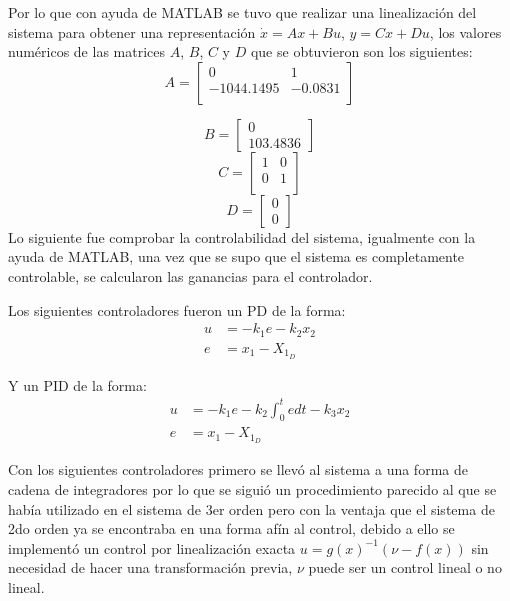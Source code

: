 \documentclass[onecolumn,10pt]{article}
\begin{document}
Por lo que con ayuda de MATLAB se tuvo que realizar una linealizaci\'on del sistema para obtener una representaci\'on $\dot{x}=Ax+Bu$, $y=Cx+Du$, los valores num\'ericos de las matrices $A$, $B$, $C$ y $D$ que se obtuvieron son los siguientes:
$$A=\begin{bmatrix}
0 & 1 \\
-1044.1495 & -0.0831\\
\end{bmatrix}$$

$$
B= \begin{bmatrix}
0  \\ 103.4836
\end{bmatrix}
$$
$$
C= \begin{bmatrix}
1 & 0 \\ 
0 & 1 \\ 
\end{bmatrix}
$$
$$
D=\begin{bmatrix}
0 \\ 0
\end{bmatrix}
$$
Lo siguiente fue comprobar la controlabilidad del sistema, igualmente con la ayuda de MATLAB, una vez que se supo que el sistema es completamente controlable, se calcularon las ganancias para el controlador.

Los siguientes controladores fueron un PD de la forma:
\begin{equation*}
\begin{split}
 u&=-k_1e-k_2x_2\\
 e&=x_1-X_{1_{D}}
\end{split}
\end{equation*}

Y un PID de la forma:
\begin{equation*}
\begin{split}
 u&=-k_1e-k_2\int_{0}^{t}edt-k_3x_2\\
 e&=x_1-X_{1_{D}}
\end{split}
\end{equation*}

Con los siguientes controladores primero se llev\'o al sistema a una forma de cadena de integradores por lo que se sigui\'o un procedimiento parecido al que se hab\'ia utilizado en el sistema de 3er orden pero con la ventaja que el sistema de 2do orden ya se encontraba en una forma af\'in al control, debido a ello se implement\'o un control por linealizaci\'on exacta $u=g(x)^{-1}(\nu-f(x))$ sin necesidad de hacer una transformaci\'on previa, $\nu$ puede ser un control lineal o no lineal.
\end{document}
